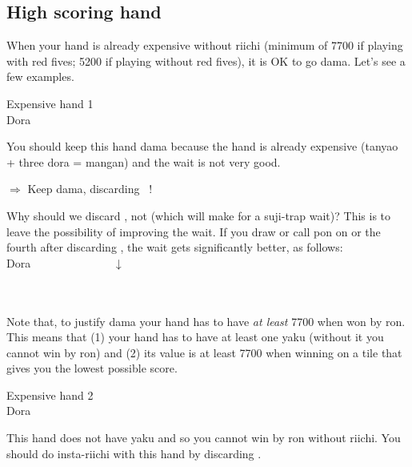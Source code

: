 \subsection{High scoring hand} \label{sec:high}
When your hand is already expensive without riichi (minimum of 7700 if playing with red fives; 5200 if playing without red fives), it is OK to go {\jap dama}. Let's see a few examples. 

\bigskip
\begin{itembox}[r]{Expensive hand 1}
\bp
{}~~\\
\hfill\footnotesize{{\jap Dora}~~~~~~~}
\ep
\vspace{-15pt}
\end{itembox}
\noindent You should keep this hand {\jap dama} because the hand is already expensive ({\jap tanyao} + three {\jap dora} = {\jap mangan}) and the wait is not very good. 
\begin{center}
{\Large $\Rightarrow$ Keep {\jap dama}, discarding  ~!}
\end{center}
Why should we discard {\LARGE{}}, not {\LARGE{}} (which will make for a {\jap suji}-trap wait)? 
This is to leave the possibility of improving the wait. If you draw or call {\jap pon} on {\LARGE{}} or the fourth {\LARGE{}} after discarding {\LARGE{}}, the wait gets significantly better, as follows:
\bp
{}~~\\
\hfill\footnotesize{{\jap Dora}~~~~~~~~~~~~~~}
\ep
\bp
\vspace{-40pt}
$\downarrow$\\
 \\
\\
\ep

\bigskip
Note that, to justify {\jap dama} your hand has to have \emph{at least} 7700 when won by {\jap ron}. This means that (1) your hand has to have at least one {\jap yaku} (without it you cannot win by {\jap ron}) and (2) its value is at least 7700 when winning on a tile that gives you the lowest possible score. 

\bigskip
\begin{itembox}[r]{Expensive hand 2}
\bp
{}~~\\
\hfill\footnotesize{{\jap Dora}~~~~~~~}
\ep
\vspace{-15pt}
\end{itembox}
\noindent 
This hand does not have {\jap yaku} and so you cannot win by {\jap ron} without riichi. You should do insta-riichi with this hand by discarding {\LARGE{}}. 


